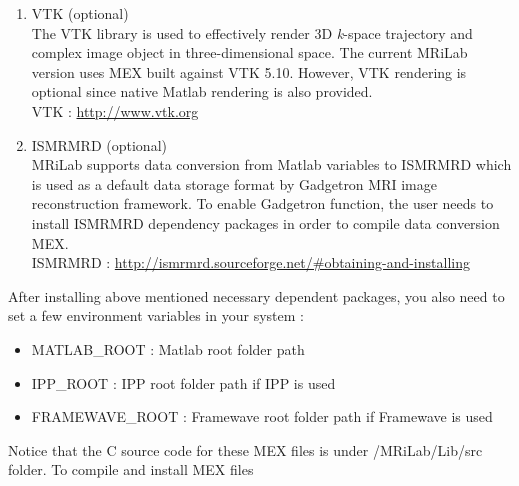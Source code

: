 \documentclass{book}%
\begin{document}
\begin{enumerate}
\item VTK (optional) \\
The VTK library is used to effectively render 3D \textit{k}-space trajectory and complex image object in three-dimensional space. The current MRiLab version uses MEX built against VTK 5.10. However, VTK rendering is optional since native Matlab rendering is also provided. \\

VTK : \url{http://www.vtk.org} \\

\item ISMRMRD (optional) \\
MRiLab supports data conversion from Matlab variables to ISMRMRD which is used as a default data storage format by Gadgetron MRI image reconstruction framework. To enable Gadgetron function, the user needs to install ISMRMRD dependency packages in order to compile data conversion MEX. \\

ISMRMRD : \url{http://ismrmrd.sourceforge.net/#obtaining-and-installing}

\end{enumerate}

After installing above mentioned necessary dependent packages, you also need to set a few environment variables in your system : 

\begin{itemize}
\item MATLAB\_ROOT : Matlab root folder path
\item IPP\_ROOT : IPP root folder path if IPP is used
\item FRAMEWAVE\_ROOT : Framewave root folder path if Framewave is used
\end{itemize}

Notice that the C source code for these MEX files is under /MRiLab/Lib/src folder. To compile and install MEX files
\end{document}
